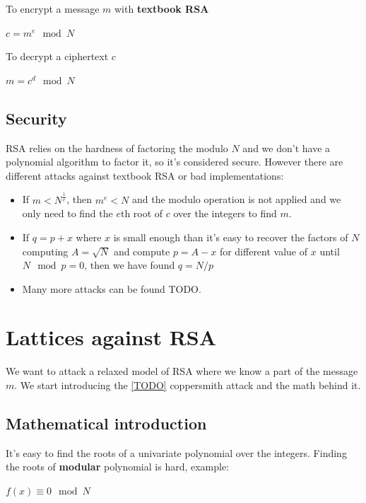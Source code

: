 \documentclass[a4paper,12pt]{report}
\begin{document}
To encrypt a message $m$ with \textbf{textbook RSA}

\begin{center}
    $c = m^e \mod N$
\end{center}

To decrypt a ciphertext $c$

\begin{center}
    $m = c^d \mod N$
\end{center}

\subsection{Security}

RSA relies on the hardness of factoring the modulo $N$ and we don't have a polynomial algorithm to factor it, so it's considered secure.
However there are different attacks against textbook RSA or bad implementations:

\begin{itemize}
    \item If $m < N^{\frac{1}{e}}$, then $m^e < N$ and the modulo operation is not applied and we only need to find the $e$th root of $c$ over the
        integers to find $m$.
    \item If $q = p + x$ where $x$ is small enough than it's easy to recover the factors of $N$ computing $A = \sqrt{N}$ and compute
            $p = A - x$ for different value of $x$ until $N \mod p = 0$, then we have found $q = N / p$
    \item Many more attacks can be found TODO.
\end{itemize}

\section{Lattices against RSA}

We want to attack a relaxed model of RSA where we know a part of the message $m$.
We start introducing the \ref{TODO} coppersmith attack and the math behind it.

\subsection{Mathematical introduction}

It's easy to find the roots of a univariate polynomial over the integers. Finding the roots of \textbf{modular} polynomial is hard, example:

\begin{center}
    $f(x) \equiv 0 \mod N$
\end{center}
\end{document}
